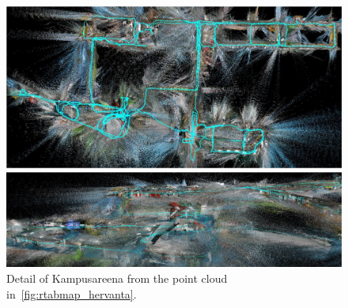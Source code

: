 \documentclass[11pt, letterpaper, twoside]{article}
\begin{document}
\begin{figure}[tb]
    \centering

    \includegraphics[width=\textwidth]{rtabmap_hervanta.png}
    \caption{%
        Point cloud of four buildings in Hervanta Campus
        (\cref{fig:campus_map}), generated with \gls{rtabmap}.
    }\label{fig:rtabmap_hervanta}

    \vspace{1em}

    \includegraphics[width=\textwidth]{rtabmap_hervanta_detail.png}
    \caption{%
        Detail of Kampusareena from the point cloud in~\cref{fig:rtabmap_hervanta}.
    }\label{fig:rtabmap_hervanta_detail}

    \vspace{1em}


\end{figure}
\end{document}
